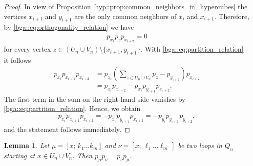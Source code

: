 \documentclass[a4paper]{amsart}
\newtheorem{lemma}[thm]{Lemma}
\begin{document}
\begin{proof}
    In view of Proposition \ref{hyp::prop:common_neighbors_in_hypercubes} the vertices $x_{i+1}$ and $y_{i+1}$ are the only common neighbors of $x_i$ and $x_{i+1}$. Therefore, by \eqref{bga::eq:orthogonality_relation} we have
    \begin{align*}
        p_{x_i} p_{z} p_{x_{i+2}} = 0
    \end{align*}
    for every vertex $z \in (U_n \cup V_n) \setminus \{x_{i+1}, y_{i+1}\}$. With \eqref{bga::eq:partition_relation} it follows
    \begin{align*}
        p_{x_i} p_{x_{i+1}} p_{x_{i+2}} 
            &= p_{x_i} \left( \sum_{z \in U_n \cup V_n} p_z - p_{y_{i+1}} \right) p_{x_{i+2}} \\
            &= p_{x_i} p_{x_{i+2}} - p_{x_i} p_{y_{i+1}} p_{x_{i+2}}.
    \end{align*}
    The first term in the sum on the right-hand side vanishes by \eqref{bga::eq:partition_relation}. Hence, we obtain
    \begin{align*}
        p_{x_i} p_{x_{i+1}} p_{x_{i+2}} = - p_{x_i} p_{y_{i+1}} p_{x_{i+2}} = - p_{y_i} p_{y_{i+1}} p_{y_{i+2}},
    \end{align*}
    and the statement follows immediately.
\end{proof}

\begin{lemma}
    \label{sub::lemma:loop_elements_commute}
    Let $\mu = [x; \, k_1 \dots k_m]$ and $\nu = [x; \, \ell_1 \dots \ell_{m^\prime}]$ be two loops in $Q_n$ starting at $x \in U_n \cup V_n$. Then $p_\mu p_\nu = p_\nu p_\mu$.
\end{lemma}
\end{document}
